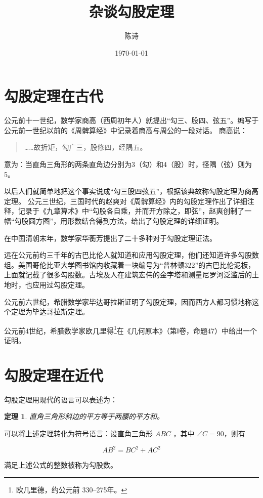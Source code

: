 \documentclass[UTF8]{ctexart}
\title{杂谈勾股定理}
\author{陈诗}
\date{\today}
\newtheorem{them}{定理}
\begin{document}
    \maketitle %
    \tableofcontents %

    \section{勾股定理在古代}
    公元前十一世纪，数学家商高（西周初年人）就提出“勾三、股四、弦五”。编写于公元前一世纪以前的《周髀算经》中记录着商高与周公的一段对话。
    商高说：
    \begin{quote}
    ……故折矩，勾广三，股修四，经隅五。  
    \end{quote}
    意为：当直角三角形的两条直角边分别为3（勾）和4（股）时，径隅（弦）则为5。
    
    以后人们就简单地把这个事实说成“勾三股四弦五”，根据该典故称勾股定理为商高定理。
公元三世纪，三国时代的赵爽对《周髀算经》内的勾股定理作出了详细注释，记录于《九章算术》中“勾股各自乘，并而开方除之，即弦”，赵爽创制了一幅“勾股圆方图”，用形数结合得到方法，给出了勾股定理的详细证明。
    
    在中国清朝末年，数学家华蘅芳提出了二十多种对于勾股定理证法。

    远在公元前约三千年的古巴比伦人就知道和应用勾股定理，他们还知道许多勾股数组。美国哥伦比亚大学图书馆内收藏着一块编号为“普林顿322”的古巴比伦泥板，上面就记载了很多勾股数。古埃及人在建筑宏伟的金字塔和测量尼罗河泛滥后的土地时，也应用过勾股定理。

    公元前六世纪，希腊数学家毕达哥拉斯证明了勾股定理，因而西方人都习惯地称这个定理为毕达哥拉斯定理。

    公元前4世纪，希腊数学家欧几里得\footnote{欧几里德，约公元前 330--275年。}在《几何原本》（第Ⅰ卷，命题47）中给出一个证明。
    \section{勾股定理在近代}
    勾股定理用现代的语言可以表述为：

    \begin{them}
        直角三角形斜边的平方等于两腰的平方和。
    \end{them}

    可以将上述定理转化为符号语言：设直角三角形 $ABC$ ，其中 $ \angle C = 90  $，则有

    \begin{equation}
        AB^2 = BC^2 + AC^2
    \end{equation}

    满足上述公式的整数被称为勾股数。

\end{document}
